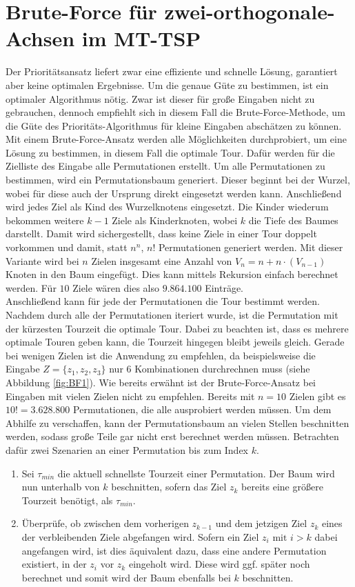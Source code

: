 \documentclass[german,version-2019-11]{uzl-thesis}
\begin{document}
\section{Brute-Force für zwei-orthogonale-Achsen im MT-TSP}

Der Prioritätsansatz liefert zwar eine effiziente und schnelle Lösung, garantiert aber keine optimalen Ergebnisse. Um die genaue Güte zu bestimmen, ist ein optimaler Algorithmus nötig. Zwar ist dieser für große Eingaben nicht zu gebrauchen, dennoch empfiehlt sich in diesem Fall die Brute-Force-Methode, um die Güte des Prioritäts-Algorithmus für kleine Eingaben abschätzen zu können. \\
Mit einem Brute-Force-Ansatz werden alle Möglichkeiten durchprobiert, um eine Lösung zu bestimmen, in diesem Fall die optimale Tour. Dafür werden für die Zielliste des Eingabe alle Permutationen erstellt. Um alle Permutationen zu bestimmen, wird ein Permutationsbaum generiert. Dieser beginnt bei der Wurzel, wobei für diese auch der Ursprung direkt eingesetzt werden kann. Anschließend wird jedes Ziel als Kind des Wurzelknotens eingesetzt. Die Kinder wiederum bekommen weitere $k-1$ Ziele als Kinderknoten, wobei $k$ die Tiefe des Baumes darstellt. Damit wird sichergestellt, dass keine Ziele in einer Tour doppelt vorkommen und damit, statt $n^n$, $n!$ Permutationen generiert werden. Mit dieser Variante wird bei $n$ Zielen insgesamt eine Anzahl von $V_n = n + n\cdot (V_{n-1})$ Knoten in den Baum eingefügt. Dies kann mittels Rekursion einfach berechnet werden. Für $10$ Ziele wären dies also $9.864.100$ Einträge.\\
Anschließend kann für jede der Permutationen die Tour bestimmt werden. Nachdem durch alle der Permutationen iteriert wurde, ist die Permutation mit der kürzesten Tourzeit die optimale Tour. Dabei zu beachten ist, dass es mehrere optimale Touren geben kann, die Tourzeit hingegen bleibt jeweils gleich. Gerade bei wenigen Zielen ist die Anwendung zu empfehlen, da beispielsweise die Eingabe $Z=\{z_1, z_2, z_3\}$ nur 6 Kombinationen durchrechnen muss (siehe Abbildung \ref{fig:BF1}). Wie bereits erwähnt ist der Brute-Force-Ansatz bei Eingaben mit vielen Zielen nicht zu empfehlen. Bereits mit $n=10$ Zielen gibt es $10! = 3.628.800$ Permutationen, die alle ausprobiert werden müssen. Um dem Abhilfe zu verschaffen, kann der Permutationsbaum an vielen Stellen beschnitten werden, sodass große Teile gar nicht erst berechnet werden müssen. Betrachten dafür zwei Szenarien an einer Permutation bis zum Index $k$.
\begin{enumerate}
\item
Sei $\tau_{min}$ die aktuell schnellste Tourzeit einer Permutation. Der Baum wird nun unterhalb von $k$ beschnitten, sofern das Ziel $z_k$ bereits eine größere Tourzeit benötigt, als $\tau_{min}$. 

\item
Überprüfe, ob zwischen dem vorherigen $z_{k-1}$ und dem jetzigen Ziel $z_{k}$ eines der verbleibenden Ziele abgefangen wird. Sofern ein Ziel $z_{i} \text{ mit } i>k$ dabei angefangen wird, ist dies äquivalent dazu, dass eine andere Permutation existiert, in der $z_i$ vor $z_k$ eingeholt wird. Diese wird ggf. später noch berechnet und somit wird der Baum ebenfalls bei $k$ beschnitten.
\end{enumerate} 
\end{document}
